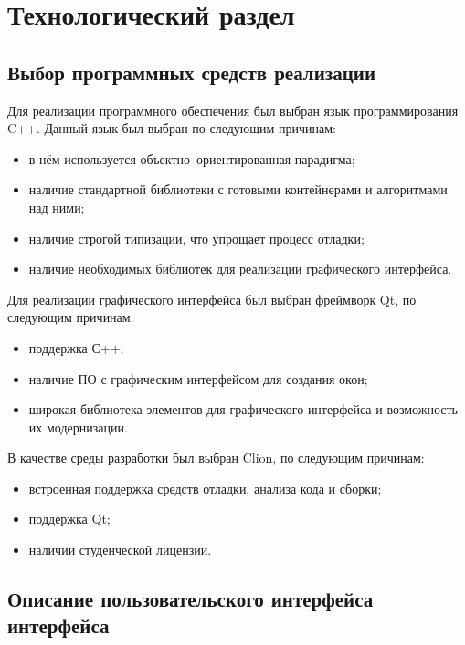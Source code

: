 \chapter{Технологический раздел}

\section{Выбор программных средств реализации}

Для реализации программного обеспечения был выбран язык программирования C++. Данный язык был выбран по следующим причинам:
\begin{itemize}[label=---]
	\item в нём используется объектно--ориентированная парадигма;
	\item наличие стандартной библиотеки с готовыми контейнерами и алгоритмами над ними;
	\item наличие строгой типизации, что упрощает процесс отладки;
	\item наличие необходимых библиотек для реализации графического интерфейса.
\end{itemize}

Для реализации графического интерфейса был выбран фреймворк Qt, по следующим причинам:
\begin{itemize}[label=---]
	\item поддержка С++;
	\item наличие ПО с графическим интерфейсом для создания окон;
	\item широкая библиотека элементов для графического интерфейса и возможность их модернизации.
\end{itemize}

В качестве среды разработки был выбран Clion, по следующим причинам:
\begin{itemize}[label=---]
	\item встроенная поддержка средств отладки, анализа кода и сборки;
	\item поддержка Qt;
	\item наличии студенческой лицензии.
\end{itemize}

\section[Описание пользовательского интерфейса интерфейса]{Описание пользовательского интерфейса\\интерфейса}

